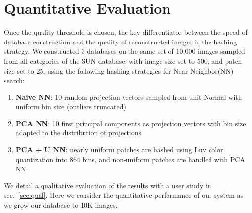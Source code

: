 \section{Quantitative Evaluation}\label{sec:performance}

Once the quality threshold is chosen, the key differentiator
between the speed of database construction and the quality of
reconstructed images is the hashing strategy.
We constructed 3 databases on the same set of
10,000 images sampled
from all categories of the SUN database, with image size
set to 500, and patch size set to 25, using the following
hashing strategies for Near Neighbor(NN) search:\\
\begin{enumerate}
\item \textbf{Naive NN}: 10 random projection vectors sampled from unit Normal with
uniform bin size (outliers truncated)
\item \textbf{PCA NN}: 10 first principal components as projection vectors with
bin size adapted to the distribution of projections
\item \textbf{PCA + U NN}: nearly uniform patches are hashed using Luv color
quantization into 864 bins, and non-uniform patches are handled with PCA NN
\end{enumerate}
We detail a qualitative evaluation of the results with a user study in sec.~\ref{sec:qual}.
Here we consider the quantitative performance of our system as we grow our database to 10K images.
